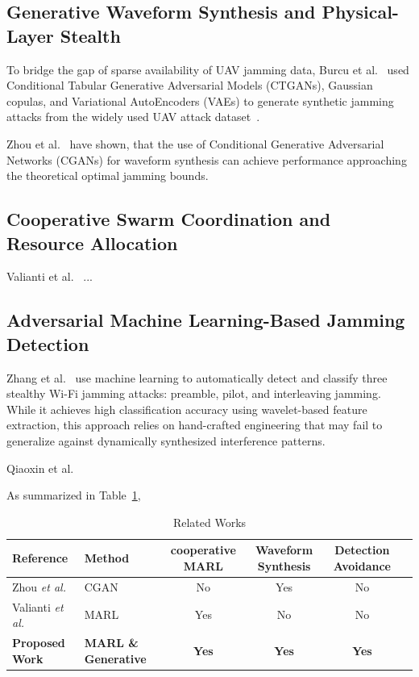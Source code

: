 \documentclass[conference]{IEEEtran}
\newcommand{\rar}[1]{{\color{blue}{[#1]}}}
\begin{document}
\subsection{Generative Waveform Synthesis and Physical-Layer Stealth}
To bridge the gap of sparse availability of UAV  jamming data, Burcu et al.~\cite{10773419} used Conditional Tabular Generative Adversarial Models (CTGANs), Gaussian copulas, and Variational AutoEncoders (VAEs) to generate synthetic jamming attacks from the widely used UAV attack dataset~\cite{whelan2020uav}. \rar{But, it doesnt synthesize the actual signal... dataset doesnt include it either.. -> not really PHY}

Zhou et al.~\cite{11184988} have shown, that the use of Conditional Generative Adversarial Networks (CGANs) for waveform synthesis can achieve performance approaching the theoretical optimal jamming bounds. \rar{but, no stealth -> is stealth truly necessary? maybe it's redundant since stealth is not realistic?}

\subsection{Cooperative Swarm Coordination and Resource Allocation}
Valianti et al.~\cite{valianti2024cooperative} ... 

\subsection{Adversarial Machine Learning-Based Jamming Detection}
Zhang et al.~\cite{zhang2023detection} use machine learning to automatically detect and classify three stealthy Wi-Fi jamming attacks: preamble, pilot, and interleaving jamming.
While it achieves high classification accuracy using wavelet-based feature extraction, this approach relies on hand-crafted engineering that may fail to generalize against dynamically synthesized interference patterns. 

Qiaoxin et al.~\cite{11161897}
\rar{out of scope: link, physical/spatial}

As summarized in Table~\ref{tab:related_works}, \rar{and so on...}
\begin{table}[!t]
\renewcommand{\arraystretch}{1.3}
\caption{Related Works} %
\label{tab:related_works}
\centering
\begin{tabular}{l l c c c l}
\hline\hline %
\textbf{Reference} & \textbf{Method} & \textbf{cooperative MARL} & \textbf{Waveform Synthesis} & \textbf{Detection Avoidance} \\ %
\hline
Zhou \emph{et al.} \cite{11184988} & CGAN & No & Yes & No \\ %
Valianti \emph{et al.} \cite{valianti2024cooperative} & MARL & Yes & No & No \\
\textbf{Proposed Work} & \textbf{MARL \& Generative} & \textbf{Yes} & \textbf{Yes} & \textbf{Yes} \\ %
\hline\hline %
\end{tabular}
\end{table}
\end{document}
